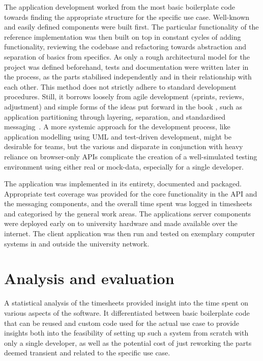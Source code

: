 The application development worked from the most basic boilerplate code towards finding the appropriate structure for the specific use case.
Well-known and easily defined components were built first.
The particular functionality of the reference implementation was then built on top in constant cycles of adding functionality, reviewing the codebase and refactoring towards abstraction and separation of basics from specifics.
As only a rough architectural model for the project was defined beforehand, tests and documentation were written later in the process, as the parts stabilised independently and in their relationship with each other.
This method does not strictly adhere to standard development procedures.
Still, it borrows loosely from agile development (sprints, reviews, adjustment) and simple forms of the ideas put forward in the book , such as application partitioning through layering, separation, and standardised messaging~\parencite{patternOrientedSoftwareArchitecture}.
A more systemic approach for the development process, like application modelling using \ac{UML} and test-driven development, might be desirable for teams, but the various and disparate  in conjunction with heavy reliance on browser-only \ac{API}s complicate the creation of a well-simulated testing environment using either real or mock-data, especially for a single developer.

The application was implemented in its entirety, documented and packaged.
Appropriate test coverage was provided for the core functionality in the API and the messaging components, and the overall time spent was logged in timesheets and categorised by the general work areas.
The application\textquotesingle s server components were deployed early on to university hardware and made available over the internet.
The client application was then run and tested on exemplary computer systems in and outside the university network.

\section{Analysis and evaluation}
\label{sec:analysis-evaluation}

A statistical analysis of the timesheets provided insight into the time spent on various aspects of the software.
It differentiated between basic boilerplate code that can be reused and custom code used for the actual use case to provide insights both into the feasibility of setting up such a system from scratch with only a single developer, as well as the potential cost of just reworking the parts deemed transient and related to the specific use case.

